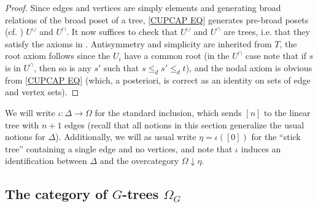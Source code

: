 \documentclass[a4paper,10pt
 ,draft
]{article}%
\begin{document}
\begin{proof}
	Since edges and vertices are simply elements and generating broad relations of the broad poset of a tree,  
	\eqref{CUPCAP EQ} generates pre-broad posets 
	(cf. \cite[Rem. 5.2]{Per18}) $U^{\cup}$ and $U^{\cap}$.
	It now suffices to check that 
	$U^{\cup}$ and $U^{\cap}$ are trees,
	i.e. that they satisfy the axioms in 
	\cite[Defs. 5.1, 5.3, 5.9]{Per18}.
	Antisymmetry and simplicity are inherited from $T$, the root axiom follows since the $U_i$ have a common root (in the $U^{\cap}$ case note that if $s$ is in $U^{\cap}$, then so is any $s'$ such that
	$s \leq_d s' \leq_d t$),
	and the nodal axiom is obvious from \eqref{CUPCAP EQ} (which, a posteriori, is correct as an identity on sets of edge and vertex sets).
\end{proof}

\begin{notation}
We will write $\iota \colon \Delta \to \Omega$ for the standard inclusion, which sends $[n]$ to the linear tree with $n+1$ edges (recall that all notions in this section generalize the usual notions for $\Delta$).
Additionally, we will as usual write $\eta =  \iota([0])$ for the ``stick tree'' containing a single edge and no vertices, and note that $\iota$ induces an identification between $\Delta$ and the overcategory $\Omega \downarrow \eta$.
\end{notation}

\subsection{The category of $G$-trees $\Omega_G$}
\end{document}

